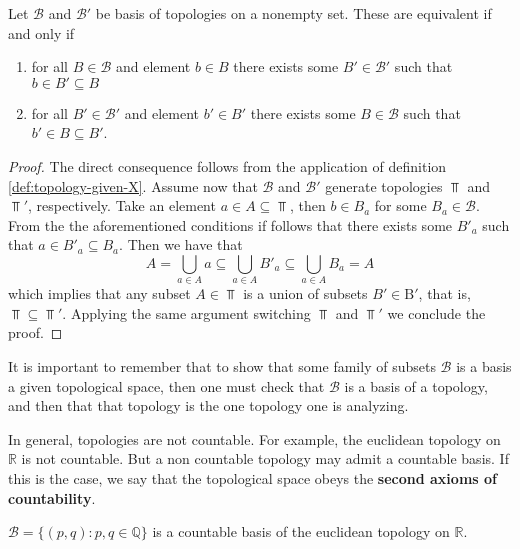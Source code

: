 \documentclass[../../main/main.tex]{subfiles}
\begin{document}
Let $\mathcal{B}$ and $\mathcal{B'}$ be basis of topologies on a nonempty set. These are equivalent if and only if

\begin{enumerate}
  \item for all $B \in \mathcal{B}$ and element $b \in B$ there exists some $B' \in \mathcal{B'}$ such that $b \in B' \subseteq B$
  \item for all $B' \in \mathcal{B'}$ and element $b' \in B'$ there exists some $B \in \mathcal{B}$ such that $b' \in B \subseteq B'$.
\end{enumerate}
\begin{proof}
  The direct consequence follows from the application of definition \ref{def:topology-given-X}. Assume now that $\mathcal{B}$ and $\mathcal{B'}$ generate topologies $\Top$ and $\Top'$, respectively. Take an element $a \in A \subseteq \Top$, then $b \in B_{a}$ for some $B_{a} \in \mathcal{B}$. From the the aforementioned conditions if follows that there exists some $B'_{a}$ such that $a \in B'_{a} \subseteq B_{a}$. Then we have that
  \begin{equation*}
    A = \bigcup_{a \in A} a \subseteq \bigcup_{a \in A} B'_{a} \subseteq \bigcup_{a \in A} B_{a} = A
  \end{equation*}
  which implies that any subset $A \in \Top$ is a union of subsets $B' \in \mathrm{B'}$, that is, $\Top \subseteq \Top'$. Applying the same argument switching $\Top$ and $\Top'$ we conclude the proof.
\end{proof}

\begin{remark}
 It is important to remember that to show that some family of subsets $\mathcal{B}$ is a basis a given topological space, then one must check that $\mathcal{B}$ is a basis of a topology, and then that that topology is the one topology one is analyzing.
\end{remark}

\begin{remark}
  In general, topologies are not countable. For example, the euclidean topology on $\mathbb{R}$ is not countable. But a non countable topology may admit a countable basis. If this is the case, we say that the topological space obeys the {\bf second axioms of countability}.
\end{remark}

\begin{example}
  $\mathcal{B} = \{ (p, q) : p, q \in \mathbb{Q}\}$ is a countable basis of the euclidean topology on $\mathbb{R}$.
\end{example}
\end{document}
